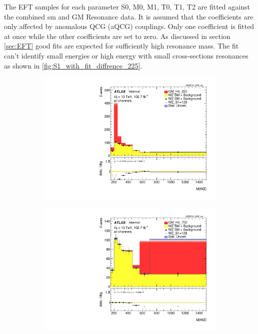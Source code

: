 \documentclass[../Bachelorarbeit.tex]{subfiles}
\begin{document}
The EFT samples for each parameter S0, M0, M1, T0, T1, T2 are fitted against the combined \acrshort{sm} and GM Resonance data. It is assumed that the coefficients are only affected by anomalous QCG (aQCG) couplings.
Only one coefficient is fitted at once while the other coefficients are set to zero. As discussed in section \ref{sec:EFT} good fits are expected for sufficiently high resonance mass.
The fit can't identify small energies or high energy with small cross-sections resonances as shown in \ref{fig:S1_with_fit_diffrence_225}.

\begin{figure}[h]
    \centering
    \begin{subfigure}{0.3\textwidth}
        \includegraphics[width=\textwidth]{Plots/operators/all_VV_MTWZ_vbs_225.pdf}
        \caption{}
    \end{subfigure}
    \begin{subfigure}{0.3\textwidth}
        \includegraphics[width=\textwidth]{Plots/operators/all_VV_MTWZ_vbs_700.pdf}

\end{subfigure}
\end{figure}
\end{document}
